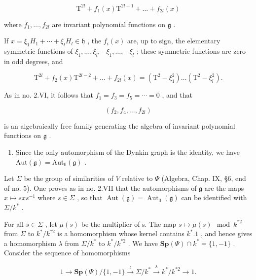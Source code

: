 \[
\mathrm{T} ^ {2 l} + f _ {1} (x) \mathrm{T} ^ {2 l - 1} + \dots + f _ {2 l} (x)
\]

where \(f_{1},\ldots ,f_{2l}\) are invariant polynomial functions on \(\mathfrak{g}\) .

If \(x = \xi_{1}H_{1} + \cdots + \xi_{l}H_{l} \in \mathfrak{h}\) , the \(f_{i}(x)\) are, up to sign, the elementary symmetric functions of \(\xi_{1}, \ldots, \xi_{l}, -\xi_{1}, \ldots, -\xi_{l}\) ; these symmetric functions are zero in odd degrees, and

\[
\mathrm{T} ^ {2 l} + f _ {2} (x) \mathrm{T} ^ {2 l - 2} + \dots + f _ {2 l} (x) = (\mathrm{T} ^ {2} - \xi_ {1} ^ {2}) \ldots (\mathrm{T} ^ {2} - \xi_ {l} ^ {2}).
\]

As in no. 2.VI, it follows that \(f_{1}=f_{3}=f_{5}=\cdots=0\) , and that

\[
(f _ {2}, f _ {4}, \dots , f _ {2 l})
\]

is an algebraically free family generating the algebra of invariant polynomial functions on \(\mathfrak{g}\) .

\begin{enumerate}
\def\labelenumi{(\Roman{enumi})}
\setcounter{enumi}{6}
\tightlist
\item
  Since the only automorphism of the Dynkin graph is the identity, we have \(\mathrm{Aut}(\mathfrak{g}) = \mathrm{Aut}_0(\mathfrak{g})\) .
\end{enumerate}

Let \(\Sigma\) be the group of similarities of \(V\) relative to \(\Psi\) (Algebra, Chap. IX, §6, end of no. 5). One proves as in no. 2.VII that the automorphisms of \(\mathfrak{g}\) are the maps \(x \mapsto sxs^{-1}\) where \(s \in \Sigma\) , so that \(\operatorname{Aut}(\mathfrak{g}) = \operatorname{Aut}_0(\mathfrak{g})\) can be identified with \(\Sigma / k^*\) .

For all \(s \in \Sigma\) , let \(\mu(s)\) be the multiplier of s. The map \(s \mapsto \mu(s) \mod k^{*2}\) from \(\Sigma\) to \(k^{*}/k^{*2}\) is a homomorphism whose kernel contains \(k^{*}.1\) , and hence gives a homomorphism \(\lambda\) from \(\Sigma/k^{*}\) to \(k^{*}/k^{*2}\) . We have \(\mathbf{Sp}(\varPsi) \cap k^{*} = \{1, -1\}\) . Consider the sequence of homomorphisms

\[
1 \longrightarrow \mathbf {S p} (\Psi) / \{1, - 1 \} \stackrel {{\iota}} {{\longrightarrow}} \Sigma / k ^ {*} \stackrel {{\lambda}} {{\longrightarrow}} k ^ {*} / k ^ {* 2} \longrightarrow 1.\tag{10}
\]

